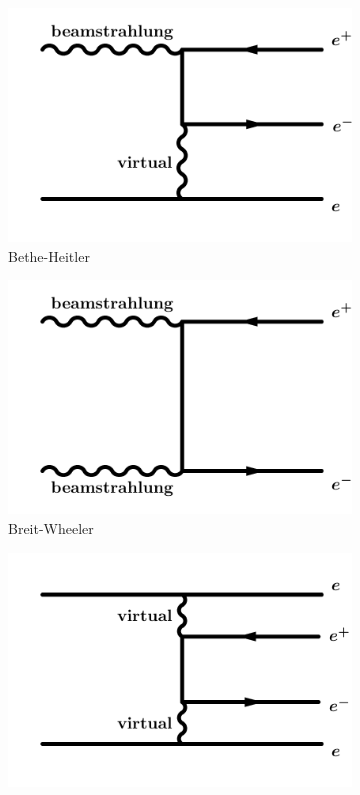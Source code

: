 \begin{figure}
\begin{subfigure}[b]{0.33\textwidth}
\includegraphics[width=\textwidth]{Figures/Bethe-Heitler.pdf}
\caption{Bethe-Heitler}
\end{subfigure}
\begin{subfigure}[b]{0.33\textwidth}
\includegraphics[width=\textwidth]{Figures/Breit-Wheeler.pdf}
\caption{Breit-Wheeler}
\end{subfigure}
\begin{subfigure}[b]{0.33\textwidth}
\includegraphics[width=\textwidth]{Figures/Landau-Lifshitz.pdf}

\end{subfigure}
\end{figure}
